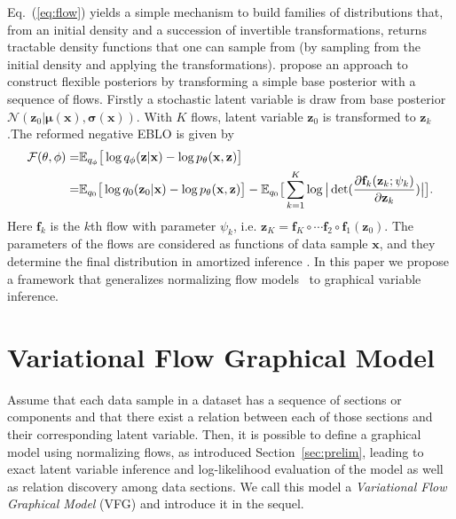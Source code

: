 \documentclass{article}
\begin{document}
Eq.~(\ref{eq:flow}) yields a simple mechanism to build families of distributions that, from an initial density and a succession of invertible transformations, returns tractable density functions that one can sample from (by sampling from the initial density and applying the transformations). \cite{rezende2015variational} propose an approach to construct flexible posteriors by transforming  a simple base posterior with a sequence of flows. Firstly a stochastic latent variable is draw from base posterior $\mathcal{N}(\mathbf{z}_0|\mathbf{\mu}(\mathbf{x}), \mathbf{\sigma}(\mathbf{x}) )$. With $K$ flows, latent variable $\mathbf{z}_0$ is transformed to $\mathbf{z}_k$.The reformed negative EBLO is given by 
\begin{align}\label{eq:flow2}
\mathcal{F}(\theta, \phi) = & \mathbb{E}_{q_{\phi}} \big[\log q_{\phi}(\mathbf{z}|\mathbf{x}) -  \log p_{\theta}(\mathbf{x},\mathbf{z}) \big] \\ \notag
= & \mathbb{E}_{q_{0}} \big[\log q_{0}(\mathbf{z}_0|\mathbf{x}) -  \log p_{\theta}(\mathbf{x},\mathbf{z}) \big]  -\mathbb{E}_{q_{0}} \big[\sum_{k=1}^K \log\big|\det(\frac{\partial \mathbf{f}_k( \mathbf{z}_k; \psi_k)}{\partial \mathbf{z}_k}) \big| \big].
\end{align}%
Here $\mathbf{f}_k$ is the $k$th flow with parameter $\psi_k$, i.e. $\mathbf{z}_K = \mathbf{f}_K \circ \cdots  \mathbf{f}_2 \circ  \mathbf{f}_1(\mathbf{z}_0)$. The parameters of the flows are considered as functions of data sample $\mathbf{x}$, and they determine the final distribution in amortized inference .
In this paper we propose a framework that generalizes normalizing flow models~\cite{rezende2015variational,berg2018sylvester} to graphical variable inference.

\vspace{-0.1in}
\section{Variational Flow Graphical Model}\label{sec:main}

Assume that each data sample in a dataset has a sequence of sections or components and that there exist a relation between each of those sections and their corresponding latent variable.
Then, it is possible to define a graphical model using normalizing flows, as introduced Section~\ref{sec:prelim}, leading to exact latent variable inference and log-likelihood evaluation of the model as well as relation discovery among data sections. 
We call this model a \textit{Variational Flow Graphical Model} (VFG) and introduce it in the sequel.
\vspace{-0.1in}
\end{document}
